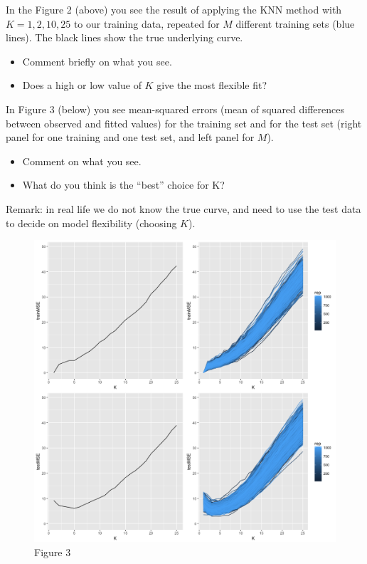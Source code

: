 \documentclass[]{article}
\providecommand{\tightlist}{%
  \setlength{\itemsep}{0pt}\setlength{\parskip}{0pt}}
\begin{document}
In the Figure 2 (above) you see the result of applying the KNN method
with \(K=1,2,10,25\) to our training data, repeated for \(M\) different
training sets (blue lines). The black lines show the true underlying
curve.

\begin{itemize}
\tightlist
\item
  Comment briefly on what you see.
\item
  Does a high or low value of \(K\) give the most flexible fit?
\end{itemize}

In Figure 3 (below) you see mean-squared errors (mean of squared
differences between observed and fitted values) for the training set and
for the test set (right panel for one training and one test set, and
left panel for \(M\)).

\begin{itemize}
\tightlist
\item
  Comment on what you see.
\item
  What do you think is the ``best'' choice for K?
\end{itemize}

Remark: in real life we do not know the true curve, and need to use the
test data to decide on model flexibility (choosing \(K\)).

\begin{figure}
\centering
\includegraphics{Prob1f3.png}
\caption{Figure 3}
\end{figure}
\end{document}
